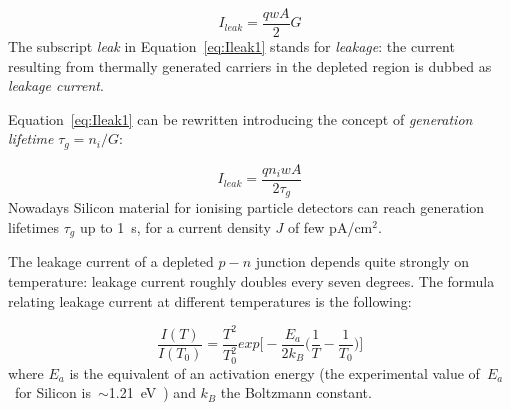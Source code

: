 \begin{equation}
I_{leak}=\dfrac{qwA}{2}G
\label{eq:Ileak1}
\end{equation}
The subscript {\it leak} in Equation~\ref{eq:Ileak1}  stands for {\it leakage}: the current resulting 
from thermally generated carriers in the depleted region is dubbed as {\it leakage current}.

Equation~\ref{eq:Ileak1} can be rewritten introducing the concept of {\it generation lifetime} 
$\tau_g=n_i/G$:

\begin{equation}
I_{leak}=\dfrac{qn_iwA}{2\tau_g}
\label{eq:Ileak2}
\end{equation}
Nowadays Silicon material for ionising particle detectors can reach generation lifetimes  $\tau_g$
up to 1~s, for a current density $J$ of few pA/cm$^2$.

The leakage current of a depleted $p-n$ junction depends quite strongly on temperature: 
leakage current roughly doubles every seven degrees. The formula relating leakage 
current at different temperatures is the following:

\begin{equation}
\dfrac{I(T)}{I(T_0)}=\dfrac{T^2}{T_0^2}exp\Big[-\dfrac{E_a}{2k_B}\Big(\dfrac{1}{T}-\dfrac{1}{T_0}\Big)\Big]
\label{eq:IleakT}
\end{equation}
where $E_a$ is the equivalent of an activation energy (the experimental value of~$E_a$~for Silicon 
is~$\sim$1.21~eV~\cite{Chilingarov_tscale}) and
$k_B$ the Boltzmann constant.



